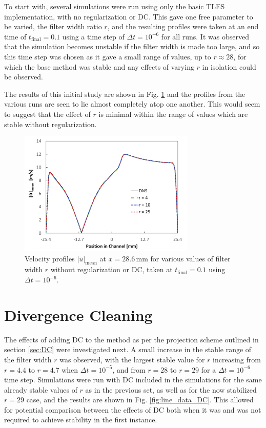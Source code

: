 To start with, several simulations were run using only the basic TLES implementation, with no regularization or DC. This gave one free parameter to be varied, the filter width ratio $r$, and the resulting profiles were taken at an end time of $t_\mathrm{final}=0.1$ using a time step of $\Delta t=10^{-6}$ for all runs. It was observed that the simulation becomes unstable if the filter width is made too large, and so this time step was chosen as it gave a small range of values, up to $r\approx 28$, for which the base method was stable and any effects of varying $r$ in isolation could be observed.

The results of this initial study are shown in Fig. \ref{fig:line_data_no_reg} and the profiles from the various runs are seen to lie almost completely atop one another. This would seem to suggest that the effect of $r$ is minimal within the range of values which are stable without regularization.

\begin{figure}[!htb]
\centering
\includegraphics[width=0.75\textwidth]{figures/line_data_no_reg.pdf}
\caption{Velocity profiles $|\bar{u}|_{\mathrm{mean}}$ at $x=28.6\,\mathrm{mm}$ for various values of filter width $r$ without regularization or DC, taken at $t_\mathrm{final}=0.1$ using $\Delta t=10^{-6}$.}
\label{fig:line_data_no_reg}
\end{figure}

\section{Divergence Cleaning}

The effects of adding DC to the method as per the projection scheme outlined in section \ref{sec:DC} were investigated next. A small increase in the stable range of the filter width $r$ was observed, with the largest stable value for $r$ increasing from $r=4.4$ to $r=4.7$ when $\Delta t=10^{-5}$, and from $r=28$ to $r=29$ for a $\Delta t=10^{-6}$ time step. Simulations were run with DC included in the simulations for the same already stable values of $r$ as in the previous set, as well as for the now stabilized $r=29$ case, and the results are shown in Fig. \ref{fig:line_data_DC}. This allowed for potential comparison between the effects of DC both when it was and was not required to achieve stability in the first instance.

